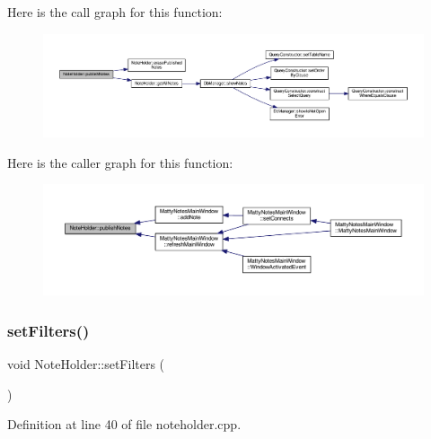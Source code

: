 Here is the call graph for this function\+:
\nopagebreak
\begin{figure}[H]
\begin{center}
\leavevmode
\includegraphics[width=350pt]{classNoteHolder_abb4a2d19ddace4d652cfda5becd03302_cgraph}
\end{center}
\end{figure}
Here is the caller graph for this function\+:
\nopagebreak
\begin{figure}[H]
\begin{center}
\leavevmode
\includegraphics[width=350pt]{classNoteHolder_abb4a2d19ddace4d652cfda5becd03302_icgraph}
\end{center}
\end{figure}
\hypertarget{classNoteHolder_a848b098c6649554c7dcc0605c90e8a24}{}\label{classNoteHolder_a848b098c6649554c7dcc0605c90e8a24} 
\subsubsection{\texorpdfstring{set\+Filters()}{setFilters()}}
{\footnotesize\ttfamily void Note\+Holder\+::set\+Filters (\begin{DoxyParamCaption}{ }\end{DoxyParamCaption})\hspace{0.3cm}{\ttfamily [static]}}



Definition at line 40 of file noteholder.\+cpp.

\hypertarget{classNoteHolder_a542006185a3eaf3e9b13fc0bfb01b2e7}{}\label{classNoteHolder_a542006185a3eaf3e9b13fc0bfb01b2e7} 
